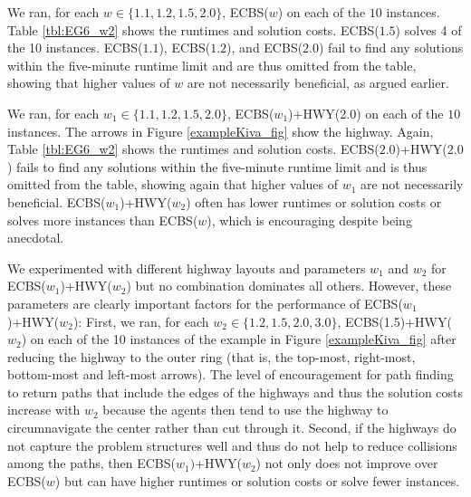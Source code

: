 \documentclass[letterpaper]{article}
\theoremstyle{definition}
\begin{document}
We ran, for each $w \in \{ 1.1, 1.2, 1.5, 2.0 \}$, ECBS($w$) on each of the
$10$ instances. Table \ref{tbl:EG6_w2} shows the runtimes and solution
costs. ECBS($1.5$) solves 4 of the 10 instances. ECBS($1.1$), ECBS($1.2$), and
ECBS($2.0$) fail to find any solutions within the five-minute runtime limit
and are thus omitted from the table, showing that higher values of $w$ are not
necessarily beneficial, as argued earlier.

We ran, for each $w_1 \in \{ 1.1, 1.2, 1.5, 2.0 \}$, ECBS($w_1$)+HWY(2.0) on
each of the $10$ instances. The arrows in Figure \ref{exampleKiva_fig} show
the highway. Again, Table \ref{tbl:EG6_w2} shows the runtimes and solution
costs. ECBS($2.0$)+HWY($2.0$) fails to find any solutions within the
five-minute runtime limit and is thus omitted from the table, showing again
that higher values of $w_1$ are not necessarily beneficial.
ECBS($w_1$)+HWY($w_2$) often has lower runtimes or solution costs or solves
more instances than ECBS($w$), which is encouraging despite being anecdotal.

We experimented with different highway layouts and parameters $w_1$ and $w_2$
for ECBS($w_1$)+HWY($w_2$) but no combination dominates all others. However,
these parameters are clearly important factors for the performance of
ECBS($w_1$)+HWY($w_2$): First, we ran, for each $w_2 \in \{ 1.2, 1.5, 2.0, 3.0
\}$, ECBS(1.5)+HWY($w_2$) on each of the 10 instances of the example in Figure
\ref{exampleKiva_fig} after reducing the highway to the outer ring (that is,
the top-most, right-most, bottom-most and left-most arrows). The level of
encouragement for path finding to return paths that include the edges of the
highways and thus the solution costs increase with $w_2$ because the agents
then tend to use the highway to circumnavigate the center rather than cut
through it. Second, if the highways do not capture the problem structures well
and thus do not help to reduce collisions among the paths, then
ECBS($w_1)$+HWY($w_2$) not only does not improve over ECBS($w$) but can have
higher runtimes or solution costs or solve fewer instances.
\end{document}

